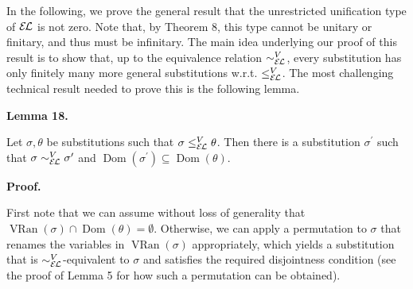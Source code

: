  
 
In the following, we prove the general result that the unrestricted unification type of $\mathcal{E\mkern-1.618muL}$ is not zero. Note that, by Theorem 8, this type cannot be unitary or finitary, and thus must be infinitary. The main idea underlying our proof of this result is to show that, up to the equivalence relation $\sim_{\mathcal{E\mkern-1.618muL}}^{V}$, every substitution has only finitely many more general substitutions w.r.t. $\leq_{\mathcal{E\mkern-1.618muL}}^{V}$. The most challenging technical result needed to prove this is the following lemma.\par
 
 
 
\par\medskip\noindent\textbf{Lemma 18.}\par
 
 
Let $\sigma,\theta$ be substitutions such that $\sigma\leq_{\mathcal{E\mkern-1.618muL}}^{V}\theta$. Then there is a substitution $\sigma^{\prime}$ such that $\sigma\sim_{\mathcal{E\mkern-1.618muL}}^{V}\sigma^{\prime}$ and $\operatorname{Dom}(\sigma^{\prime})\subseteq\operatorname{Dom}(\theta)$.\par
 
 
 
 
 
\par\medskip\noindent\textbf{Proof.}\par
 
 
First note that we can assume without loss of generality that $\operatorname{VRan}(\sigma)\cap\operatorname{Dom}(\theta)=\emptyset$. Otherwise, we can apply a permutation to $\sigma$ that renames the variables in $\operatorname{VRan}(\sigma)$ appropriately, which yields a substitution that is $\sim_{\mathcal{E\mkern-1.618muL}}^{V}$-equivalent to $\sigma$ and satisfies the required disjointness condition (see the proof of Lemma 5 for how such a permutation can be obtained).\par
 
